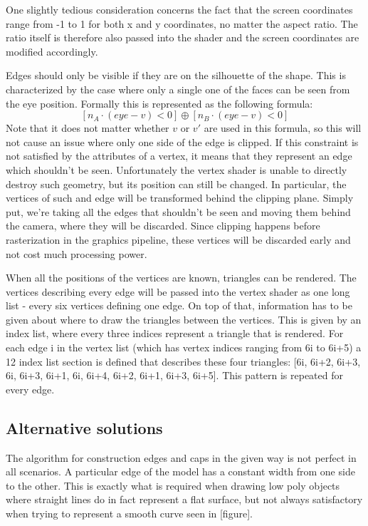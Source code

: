 \documentclass[a4paper, 12pt]{article}
\begin{document}
One slightly tedious consideration concerns the fact that the screen coordinates range from -1 to 1 for both x and y coordinates, no matter the aspect ratio. The ratio itself is therefore also passed into the shader and the screen coordinates are modified accordingly.

Edges should only be visible if they are on the silhouette of the shape. This is characterized by the case where only a single one of the faces can be seen from the eye position. Formally this is represented as the following formula:
$$[n_A \cdot (eye-v) < 0] \oplus [n_B \cdot (eye-v) < 0]$$
Note that it does not matter whether $v$ or $v'$ are used in this formula, so this will not cause an issue where only one side of the edge is clipped. If this constraint is not satisfied by the attributes of a vertex, it means that they represent an edge which shouldn't be seen. Unfortunately the vertex shader is unable to directly destroy such geometry, but its position can still be changed. In particular, the vertices of such and edge will be transformed behind the clipping plane. Simply put, we're taking all the edges that shouldn't be seen and moving them behind the camera, where they will be discarded. Since clipping happens before rasterization in the graphics pipeline, these vertices will be discarded early and not cost much processing power.

When all the positions of the vertices are known, triangles can be rendered. The vertices describing every edge will be passed into the vertex shader as one long list - every six vertices defining one edge. On top of that, information has to be given about where to draw the triangles between the vertices. This is given by an index list, where every three indices represent a triangle that is rendered. For each edge i in the vertex list (which has vertex indices ranging from 6i to 6i+5) a 12 index list section is defined that describes these four triangles: [6i, 6i+2, 6i+3, 6i, 6i+3, 6i+1, 6i, 6i+4, 6i+2, 6i+1, 6i+3, 6i+5]. This pattern is repeated for every edge.


\subsection{Alternative solutions}

The algorithm for construction edges and caps in the given way is not perfect in all scenarios. A particular edge of the model has a constant width from one side to the other. This is exactly what is required when drawing low poly objects where straight lines do in fact represent a flat surface, but not always satisfactory when trying to represent a smooth curve seen in [figure].
\end{document}
